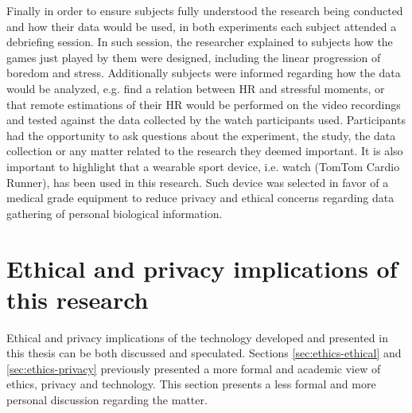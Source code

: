 Finally in order to ensure subjects fully understood the research being conducted and how their data would be used, in both experiments each subject attended a debriefing session. In such session, the researcher explained to subjects how the games just played by them were designed, including the linear progression of boredom and stress. Additionally subjects were informed regarding how the data would be analyzed, e.g. find a relation between HR and stressful moments, or that remote estimations of their HR would be performed on the video recordings and tested against the data collected by the watch participants used. Participants had the opportunity to ask questions about the experiment, the study, the data collection or any matter related to the research they deemed important. It is also important to highlight that a wearable sport device, i.e. watch (TomTom Cardio Runner), has been used in this research. Such device was selected in favor of a medical grade equipment to reduce privacy and ethical concerns regarding data gathering of personal biological information.

\section{Ethical and privacy implications of this research}
\label{sec:ethics-implications}

Ethical and privacy implications of the technology developed and presented in this thesis can be both discussed and speculated. Sections \ref{sec:ethics-ethical} and \ref{sec:ethics-privacy} previously presented a more formal and academic view of ethics, privacy and technology. This section presents a less formal and more personal discussion regarding the matter.


